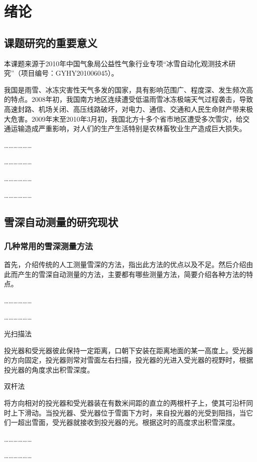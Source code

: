 \chapter{绪论}

\section{课题研究的重要意义}

本课题来源于2010年中国气象局公益性气象行业专项“冰雪自动化观测技术研究”（项目编号：GYHY201006045）。

我国是雨雪、冰冻灾害性天气多发的国家，具有影响范围广、程度深、发生频次高的特点。2008年初，我国南方地区连续遭受低温雨雪冰冻极端天气过程袭击，导致高速封路、机场关闭、高压线路破坏，对电力、通信、交通和人民生命财产带来极大危害。2009年末至2010年3月初，我国北方十多个省市地区遭受多次雪灾，给交通运输造成严重影响，对人们的生产生活特别是农林畜牧业生产造成巨大损失。

………………

………………

………………

………………

\section{雪深自动测量的研究现状}

\subsection{几种常用的雪深测量方法}

首先，介绍传统的人工测量雪深的方法，指出此方法的优点以及不足。然后介绍由此而产生的雪深自动测量的方法，主要都有哪些测量方法，简要介绍各种方法的特点\cite{ref-wetland,ref-water}。

………………

………………

光扫描法

投光器和受光器彼此保持一定距离，口朝下安装在距离地面的某一高度上。受光器的方向固定，投光器则常对雪面左右扫描，投光器的光进入受光器的视野时，根据投光器的角度求出积雪深度。

双杆法

将方向相对的投光器和受光器装在有数米间距的直立的两根杆子上，使其可沿杆同时上下滑动。当投光器、受光器位于雪面下方时，来自投光器的光受到阻挡，当它们一超出雪面，受光器就接收到投光器的光。根据这时的高度求出积雪深度。

………………

………………

